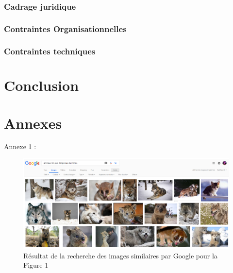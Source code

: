 \documentclass[a4paper,12pt]{article}
\begin{document}
\subsubsection{Cadrage juridique}
\subsubsection{Contraintes Organisationnelles}
\subsubsection{Contraintes techniques}
\newpage
{}
\section*{Conclusion}


\newpage



\section{Annexes}
Annexe 1 : 
\begin{figure}[!ht]
    \centering
    \includegraphics[scale=0.8]{images/Res2GI.PNG}
    \caption{Résultat de la recherche des images similaires par Google pour la Figure 1}
\end{figure}
\end{document}
